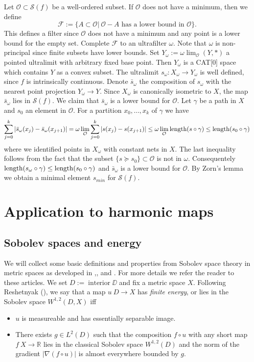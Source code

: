 \documentclass[a4paper,10pt]{amsart}
\begin{document}
Let $\mathcal{O}\subset\mathcal{S}(f)$ be a well-ordered subset. If $\mathcal{O}$ does not
have a minimum, then we define
$$
\mathcal{F}:=\{A\subset\mathcal{O}|\ \mathcal{O}-A\text{ has a lower bound in }\mathcal{O}\}.
$$
This defines a filter since $\mathcal{O}$ does not have a minimum and any point is a lower bound for the empty set.
Complete $\mathcal{F}$ to an ultrafilter $\omega$. Note that $\omega$ is non-principal since finite subsets have lower bounds.
Set $Y_\omega:=\omega\lim_{\mathcal{O}}(Y,*)$ a pointed ultralimit with arbitrary fixed base point. Then $Y_\omega$
is a CAT[0] space which contains $Y$ as a convex subset. The ultralimit $s_\omega:X_\omega\to Y_\omega$ is well defined, since
$f$ is intrinsically continuous. Denote $\bar s_\omega$ the composition of $s_\omega$ with the nearest point projection $Y_\omega\to Y$.
Since $X_\omega$ is canonically isometric to $X$, the map $\bar s_\omega$ lies in $\mathcal{S}(f)$. We claim that $\bar s_\omega$
is a lower bound for $\mathcal{O}$. Let $\gamma$ be a path in $X$ and $s_0$ an element in $\mathcal{O}$. For a partition $x_0,\ldots,x_k$
of $\gamma$ we have
$$
\sum_{j=0}^k|\bar s_\omega(x_j)-\bar s_\omega(x_{j+1})|=\omega\lim_{\mathcal{O}}\sum_{j=0}^k|s(x_j)-s(x_{j+1})|\leq \omega\lim_{\mathcal{O}}\mathop{\rm length}\nolimits(s\circ\gamma)\leq \mathop{\rm length}\nolimits(s_0\circ\gamma)
$$
where we identified points in $X_\omega$ with constant nets in $X$. The last inequality follows from the fact that the subset $\{s\succcurlyeq s_0\}\subset \mathcal{O}$
is not in $\omega$. Consequentely $\mathop{\rm length}\nolimits(s_\omega\circ\gamma)\leq \mathop{\rm length}\nolimits(s_0\circ\gamma)$ and $\bar s_\omega$
is a lower bound for $\mathcal{O}$. By Zorn's lemma we obtain a minimal element $s_{min}$ for $\mathcal{S}(f)$.
\qeds





\section{Application to harmonic maps}

\subsection{Sobolev spaces and energy}

We will collect some basic definitions and properties from Sobolev space theory in metric spaces as developed in 
\cite{KS},\cite{R}, \cite{HKST} and \cite{LW}. For more details we refer the reader to these articles.
We set $D:=\operatorname{interior}\DD$ and fix a metric space $X$.
Following Reshetnyak (\cite{R}), we say that a map $u\:D\to X$ has {\em finite energy}, or lies in the Sobolev space $W^{1,2}(D,X)$ iff
\begin{itemize}
 \item $u$ is measureable and has essentially separable image.
 \item There exists $g\in L^2(D)$ such that the composition $f\circ u$ with any short map $f\:X\to \mathbb{R}$ lies in the classical Sobolev space $W^{1,2}(D)$
 and the norm of the gradient $|\nabla(f\circ u)|$ is almost everywhere bounded by $g$.
\end{itemize}
\end{document}
